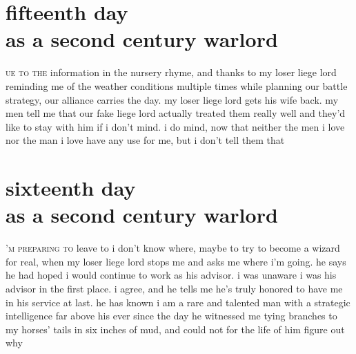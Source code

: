 \documentclass[smalldemyvopaper,11pt,twoside,onecolumn,openany,extrafontsizes]{memoir}
\newlength\drop
\begin{document}
\chapter{fifteenth day\\as a second century warlord}
\lettrine[lhang=0.2,lines=3,findent=2pt]{}{ue to the} information
in the nursery rhyme, and thanks to my loser liege lord reminding me of the
weather conditions multiple times while planning our battle strategy, our
alliance carries the day. my loser liege lord gets his wife back. my men tell
me that our fake liege lord actually treated them really well and they'd like
to stay with him if i don't mind. i do mind, now that neither the men i love
nor the man i love have any use for me, but i don't tell them that

\chapter{sixteenth day\\as a second century warlord}
\lettrine[lhang=0.2,lines=3,findent=0pt]{}{'m preparing to}
leave to i don't know where, maybe to try to become a wizard for real, when my
loser liege lord stops me and asks me where i'm going. he says he had hoped i
would continue to work as his advisor. i was unaware i was his advisor in the
first place. i agree, and he tells me he's truly honored to have me in his
service at last. he has known i am a rare and talented man with a strategic
intelligence far above his ever since the day he witnessed me tying branches to
my horses' tails in six inches of mud, and could not for the life of him figure out why
\end{document}
